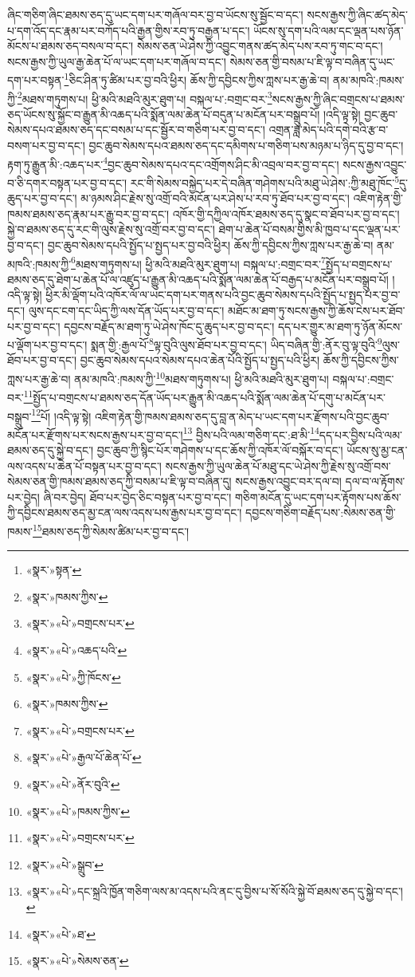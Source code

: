 ཞིང་གཅིག་ཞིང་ཐམས་ཅད་དུ་ཡང་དག་པར་གཞོལ་བར་བྱ་བ་ཡོངས་སུ་སྦྱོང་བ་དང་། སངས་རྒྱས་ཀྱི་ཞིང་ཚད་མེད་པ་དག་འོད་དང་རྣམ་པར་བཀོད་པའི་རྒྱན་གྱིས་རབ་ཏུ་བརྒྱན་པ་དང་། ཡོངས་སུ་དག་པའི་ལམ་དང་ལྡན་པས་ཉོན་མོངས་པ་ཐམས་ཅད་བསལ་བ་དང་། སེམས་ཅན་ཡེ་ཤེས་ཀྱི་འབྱུང་གནས་ཚད་མེད་པས་རབ་ཏུ་གང་བ་དང་། སངས་རྒྱས་ཀྱི་ཡུལ་རྒྱ་ཆེན་པོ་ལ་ཡང་དག་པར་གཞོལ་བ་དང་། སེམས་ཅན་གྱི་བསམ་པ་ཇི་ལྟ་བ་བཞིན་དུ་ཡང་དག་པར་བསྟན་\footnote{«སྣར་»སྟན་}ཅིང་ཤིན་ཏུ་ཚིམ་པར་བྱ་བའི་ཕྱིར། ཆོས་ཀྱི་དབྱིངས་ཀྱིས་ཀླས་པར་རྒྱ་ཆེ་བ། ནམ་མཁའི་:ཁམས་ཀྱི་\footnote{«སྣར་»ཁམས་ཀྱིས་}མཐས་གཏུགས་པ། ཕྱི་མའི་མཐའི་མུར་ཐུག་པ། བསྐལ་པ་:བགྲང་བར་\footnote{«སྣར་»«པེ་»བགྲངས་པར་}སངས་རྒྱས་ཀྱི་ཞིང་བགྲངས་པ་ཐམས་ཅད་ཡོངས་སུ་སྐྱོང་བ་རྒྱུན་མི་འཆད་པའི་སྨོན་ལམ་ཆེན་པོ་བདུན་པ་མངོན་པར་བསྒྲུབ་པོ། །འདི་ལྟ་སྟེ། བྱང་ཆུབ་སེམས་དཔའ་ཐམས་ཅད་དང་བསམ་པ་དང་སྦྱོར་བ་གཅིག་པར་བྱ་བ་དང་། འགྲན་ཟླ་མེད་པའི་དགེ་བའི་རྩ་བ་བསག་པར་བྱ་བ་དང་། བྱང་ཆུབ་སེམས་དཔའ་ཐམས་ཅད་དང་དམིགས་པ་གཅིག་པས་མཉམ་པ་ཉིད་དུ་བྱ་བ་དང་། རྟག་ཏུ་རྒྱུན་མི་:འཆད་པར་\footnote{«སྣར་»«པེ་»འཆད་པའི་}བྱང་ཆུབ་སེམས་དཔའ་དང་འགྲོགས་ཤིང་མི་འབྲལ་བར་བྱ་བ་དང་། སངས་རྒྱས་འབྱུང་བ་ཅི་དགར་བསྟན་པར་བྱ་བ་དང་། རང་གི་སེམས་བསྐྱེད་པར་དེ་བཞིན་གཤེགས་པའི་མཐུ་ཡེ་ཤེས་:ཀྱི་མཐུ་ཁོང་\footnote{«སྣར་»«པེ་»ཀྱི་ཁོངས་}དུ་ཆུད་པར་བྱ་བ་དང་། མ་ཉམས་ཤིང་རྗེས་སུ་འགྲོ་བའི་མངོན་པར་ཤེས་པ་རབ་ཏུ་ཐོབ་པར་བྱ་བ་དང་། འཇིག་རྟེན་གྱི་ཁམས་ཐམས་ཅད་རྣམ་པར་རྒྱུ་བར་བྱ་བ་དང་། འཁོར་གྱི་དཀྱིལ་འཁོར་ཐམས་ཅད་དུ་སྣང་བ་ཐོབ་པར་བྱ་བ་དང་། སྐྱེ་བ་ཐམས་ཅད་དུ་རང་གི་ལུས་རྗེས་སུ་འགྲོ་བར་བྱ་བ་དང་། ཐེག་པ་ཆེན་པོ་བསམ་གྱིས་མི་ཁྱབ་པ་དང་ལྡན་པར་བྱ་བ་དང་། བྱང་ཆུབ་སེམས་དཔའི་སྤྱོད་པ་སྤྱད་པར་བྱ་བའི་ཕྱིར། ཆོས་ཀྱི་དབྱིངས་ཀྱིས་ཀླས་པར་རྒྱ་ཆེ་བ། ནམ་མཁའི་:ཁམས་ཀྱི་\footnote{«སྣར་»ཁམས་ཀྱིས་}མཐས་གཏུགས་པ། ཕྱི་མའི་མཐའི་མུར་ཐུག་པ། བསྐལ་པ་:བགྲང་བར་\footnote{«སྣར་»«པེ་»བགྲངས་པར་}སྤྱོད་པ་བགྲངས་པ་ཐམས་ཅད་དུ་ཐེག་པ་ཆེན་པོ་ལ་འཛུད་པ་རྒྱུན་མི་འཆད་པའི་སྨོན་ལམ་ཆེན་པོ་བརྒྱད་པ་མངོན་པར་བསྒྲུབ་པོ། །འདི་ལྟ་སྟེ། ཕྱིར་མི་ལྡོག་པའི་འཁོར་ལོ་ལ་ཡང་དག་པར་གནས་པའི་བྱང་ཆུབ་སེམས་དཔའི་སྤྱོད་པ་སྤྱད་པར་བྱ་བ་དང་། ལུས་དང་ངག་དང་ཡིད་ཀྱི་ལས་དོན་ཡོད་པར་བྱ་བ་དང་། མཐོང་མ་ཐག་ཏུ་སངས་རྒྱས་ཀྱི་ཆོས་ངེས་པར་ཐོབ་པར་བྱ་བ་དང་། དབྱངས་བརྗོད་མ་ཐག་ཏུ་ཡེ་ཤེས་ཁོང་དུ་ཆུད་པར་བྱ་བ་དང་། དད་པར་གྱུར་མ་ཐག་ཏུ་ཉོན་མོངས་པ་ལྡོག་པར་བྱ་བ་དང་། སྨན་གྱི་:རྒྱལ་པོ་\footnote{«སྣར་»«པེ་»རྒྱལ་པོ་ཆེན་པོ་}ལྟ་བུའི་ལུས་ཐོབ་པར་བྱ་བ་དང་། ཡིད་བཞིན་གྱི་:ནོར་བུ་ལྟ་བུའི་\footnote{«སྣར་»«པེ་»ནོར་བུའི་}ལུས་ཐོབ་པར་བྱ་བ་དང་། བྱང་ཆུབ་སེམས་དཔའ་སེམས་དཔའ་ཆེན་པོའི་སྤྱོད་པ་སྤྱད་པའི་ཕྱིར། ཆོས་ཀྱི་དབྱིངས་ཀྱིས་ཀླས་པར་རྒྱ་ཆེ་བ། ནམ་མཁའི་:ཁམས་ཀྱི་\footnote{«སྣར་»«པེ་»ཁམས་ཀྱིས་}མཐས་གཏུགས་པ། ཕྱི་མའི་མཐའི་མུར་ཐུག་པ། བསྐལ་པ་:བགྲང་བར་\footnote{«སྣར་»«པེ་»བགྲངས་པར་}སྤྱོད་པ་བགྲངས་པ་ཐམས་ཅད་དོན་ཡོད་པར་རྒྱུན་མི་འཆད་པའི་སྨོན་ལམ་ཆེན་པོ་དགུ་པ་མངོན་པར་བསྒྲུབ་\footnote{«སྣར་»«པེ་»སྒྲུབ་}པོ། །འདི་ལྟ་སྟེ། འཇིག་རྟེན་གྱི་ཁམས་ཐམས་ཅད་དུ་བླ་ན་མེད་པ་ཡང་དག་པར་རྫོགས་པའི་བྱང་ཆུབ་མངོན་པར་རྫོགས་པར་སངས་རྒྱས་པར་བྱ་བ་དང་།\footnote{«སྣར་»«པེ་»དང་སྐྲའི་ཁྱོན་གཅིག་ལས་མ་འདས་པའི་ནང་དུ་བྱིས་པ་སོ་སོའི་སྐྱེ་བོ་ཐམས་ཅད་དུ་སྐྱེ་བ་དང་།} བྱིས་པའི་ལམ་གཅིག་དང་:ཐ་མི་\footnote{«སྣར་»«པེ་»ཐ་}དད་པར་བྱིས་པའི་ལམ་ཐམས་ཅད་དུ་སྐྱེ་བ་དང་། བྱང་ཆུབ་ཀྱི་སྙིང་པོར་གཤེགས་པ་དང་ཆོས་ཀྱི་འཁོར་ལོ་བསྐོར་བ་དང་། ཡོངས་སུ་མྱ་ངན་ལས་འདས་པ་ཆེན་པོ་བསྟན་པར་བྱ་བ་དང་། སངས་རྒྱས་ཀྱི་ཡུལ་ཆེན་པོ་མཐུ་དང་ཡེ་ཤེས་ཀྱི་རྗེས་སུ་འགྲོ་བས་སེམས་ཅན་གྱི་ཁམས་ཐམས་ཅད་ཀྱི་བསམ་པ་ཇི་ལྟ་བ་བཞིན་དུ། སངས་རྒྱས་འབྱུང་བར་དལ་བ། དལ་བ་ལ་རྟོགས་པར་བྱེད། ཞི་བར་བྱེད། ཐོབ་པར་བྱེད་ཅིང་བསྟན་པར་བྱ་བ་དང་། གཅིག་མངོན་དུ་ཡང་དག་པར་རྟོགས་པས་ཆོས་ཀྱི་དབྱིངས་ཐམས་ཅད་མྱ་ངན་ལས་འདས་པས་རྒྱས་པར་བྱ་བ་དང་། དབྱངས་གཅིག་བརྗོད་པས་:སེམས་ཅན་གྱི་ཁམས་\footnote{«སྣར་»«པེ་»སེམས་ཅན་}ཐམས་ཅད་ཀྱི་སེམས་ཚིམ་པར་བྱ་བ་དང་། 